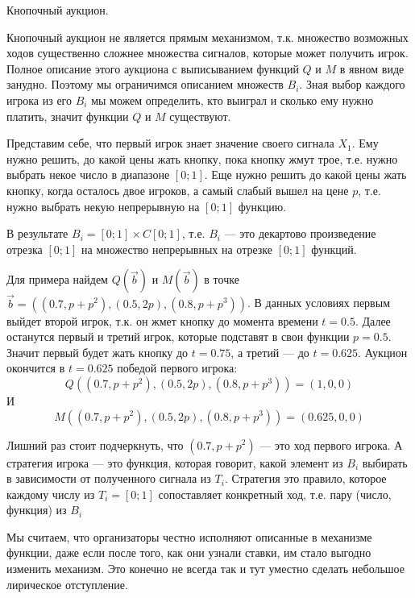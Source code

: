 \begin{myex} Кнопочный аукцион. 

Кнопочный аукцион не является прямым механизмом, т.к. множество возможных ходов существенно сложнее множества сигналов, которые может получить игрок. Полное описание этого аукциона с выписыванием функций $ Q $ и $ M $ в явном виде  занудно. Поэтому мы ограничимся описанием множеств $ B_{i} $. Зная выбор каждого игрока из его $ B_{i} $ мы можем определить, кто выиграл и сколько ему нужно платить, значит функции $ Q $ и $ M $ существуют.

Представим себе, что первый игрок знает значение  своего сигнала $ X_{1} $. Ему нужно решить, до какой цены жать кнопку, пока кнопку жмут трое, т.е. нужно выбрать некое число в диапазоне $ [0;1] $. Еще нужно решить до какой цены жать кнопку, когда осталось двое игроков, а самый слабый вышел на цене $ p $, т.е. нужно выбрать некую непрерывную на $ [0;1] $ функцию.

В результате $ B_{i}=[0;1]\times C[0;1] $, т.е. $ B_{i} $ --- это декартово произведение отрезка $ [0;1] $ на множество непрерывных на отрезке $ [0;1] $ функций.

Для примера найдем $ Q(\vec{b})$ и $ M(\vec{b}) $ в точке  $\vec{b}=((0.7,p+p^{2}),(0.5,2p),(0.8,p+p^{3})) $. В данных условиях первым выйдет второй игрок, т.к. он жмет кнопку до момента времени $ t=0.5 $. Далее останутся первый и третий игрок, которые подставят в свои функции $ p=0.5 $. Значит первый будет жать кнопку до $ t=0.75 $, а третий --- до $ t=0.625 $. Аукцион окончится в $ t=0.625 $ победой первого игрока:
\begin{equation}
Q((0.7,p+p^{2}),(0.5,2p),(0.8,p+p^{3}))=(1,0,0)
\end{equation}
И
\begin{equation}
M((0.7,p+p^{2}),(0.5,2p),(0.8,p+p^{3}))=(0.625,0,0)
\end{equation}

Лишний раз стоит подчеркнуть, что $ (0.7,p+p^{2}) $ --- это ход первого игрока. А стратегия игрока --- это функция, которая говорит, какой элемент из $ B_{i} $ выбирать в зависимости от полученного сигнала из $ T_{i} $. Стратегия это правило, которое каждому числу из $ T_{i}=[0;1] $ сопоставляет конкретный ход, т.е. пару (число, функция) из $ B_{i} $

\end{myex}

Мы считаем, что организаторы честно исполняют описанные в механизме функции, даже если после того, как они узнали ставки, им стало выгодно изменить механизм. Это конечно не всегда так и тут уместно сделать небольшое лирическое отступление.

